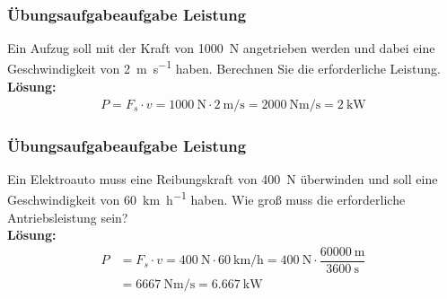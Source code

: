 \documentclass{beamer}
\begin{document}
\frame
{
  \frametitle{Übungsaufgabeaufgabe Leistung}
{
Ein Aufzug soll mit der Kraft von \SI{1000}{\newton} angetrieben werden und dabei eine Geschwindigkeit von \SI{2}{\meter\per\second} haben. Berechnen Sie die erforderliche Leistung.\\
}
{
\textbf{Lösung:}	
	\begin{align*}
	P=F_s\cdot v=\SI{1000}{\newton}\cdot\SI{2}{\meter\per\second}=\SI{2000}{\newton\meter\per\second}=\SI{2}{\kilo\watt}
	\end{align*}
}
}

\frame
{
  \frametitle{Übungsaufgabeaufgabe Leistung}
{
Ein Elektroauto muss eine Reibungskraft von \SI{400}{\newton} überwinden und soll eine Geschwindigkeit von \SI{60}{\kilo\meter\per\hour} haben. Wie groß muss die erforderliche Antriebsleistung sein?\\
}
{
\textbf{Lösung:}	
	\begin{align*}
	P&=F_s\cdot v=\SI{400}{\newton}\cdot\SI{60}{\kilo\meter\per\hour}=\SI{400}{\newton}\cdot\dfrac{\SI{60000}{\meter}}{\SI{3600}{\second}}\\&=\SI{6667}{\newton\meter\per\second}=\SI{6,667}{\kilo\watt}
	\end{align*}
}
}
\end{document}
